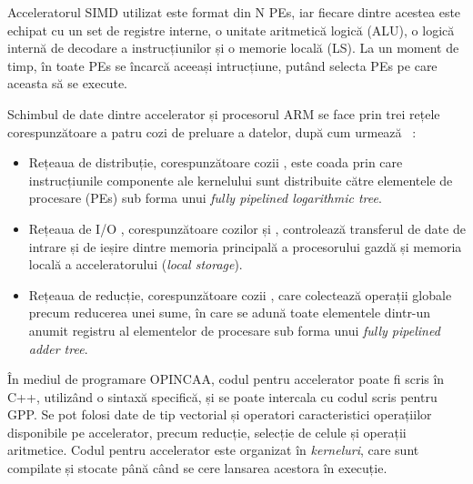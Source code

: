 Acceleratorul SIMD utilizat este format din N PEs, iar fiecare dintre acestea
este echipat cu un set de registre interne, o unitate aritmetică logică (ALU), o
logică internă de decodare a instrucțiunilor și o memorie locală (LS). La un
moment de timp, în toate PEs se încarcă aceeași intrucțiune, putând selecta
PEs pe care aceasta să se execute. \\
 

Schimbul de date dintre accelerator și procesorul ARM se face prin trei rețele
corespunzătoare a patru cozi de preluare a datelor, după cum urmează
~\cite{fpga-visual}:
\begin{itemize}
  \item Rețeaua de distribuție, corespunzătoare cozii ,
  este coada prin care instrucțiunile componente ale kernelului sunt distribuite
  către elementele de procesare (PEs) sub forma unui \textit{fully pipelined
  logarithmic tree}.

  \item Rețeaua de I/O , corespunzătoare cozilor
   și , controlează transferul de date de intrare
  și de ieșire dintre memoria principală a procesorului gazdă și memoria locală
  a acceleratorului (\textit{local storage}).

  \item Rețeaua de reducție, corespunzătoare cozii , care
  colectează operații globale precum reducerea unei sume, în care se adună toate
  elementele dintr-un anumit registru al elementelor de procesare sub forma unui
  \textit{fully pipelined adder tree}.
\end{itemize}

În mediul de programare OPINCAA, codul pentru accelerator poate fi scris în C++,
utilizând o sintaxă specifică, și se poate intercala cu codul scris pentru GPP.
Se pot folosi date de tip vectorial și operatori caracteristici operațiilor
disponibile pe accelerator, precum reducție, selecție de celule și operații
aritmetice. Codul pentru accelerator este organizat în \textit{kerneluri}, care
sunt compilate și stocate până când se cere lansarea acestora în execuție. \\

